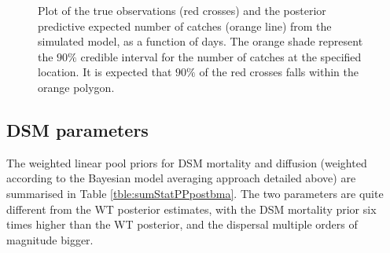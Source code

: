 \documentclass[]{bmcart}
\begin{document}
\begin{figure}[t]
\caption[Plot of the true observations (red crosses) and the expected number of catches (orange line) from the simulated model]{Plot of the true observations (red crosses) and the posterior predictive expected number of catches (orange line) from the simulated model, as a function of days. The orange shade represent the $90\%$ credible interval for the number of catches at the specified location. It is expected that $90\%$ of the red crosses falls within the orange polygon.}\label{fig:Post_Data}
\end{figure}

\subsection{DSM parameters}
The weighted linear pool priors for DSM mortality and diffusion (weighted according to the Bayesian model averaging approach detailed above) are summarised in Table \ref{tble:sumStatPPpostbma}. The two parameters are quite different from the WT posterior estimates, with the DSM mortality prior six times higher than the WT posterior, and the dispersal multiple orders of magnitude bigger. 
\end{document}
